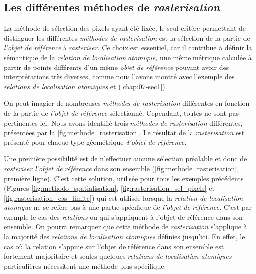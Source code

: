 \subsection{Les différentes méthodes de \emph{rasterisation}}

La méthode de sélection des pixels ayant été fixée, le seul critère
permettant de distinguer les différentes \emph{méthodes de
  rasterisation} est la sélection de la partie de \emph{l'objet de
  référence} à \emph{rasteriser.} Ce choix est essentiel, car il
contribue à définir la sémantique de la \emph{relation de localisation
  atomique,} une même métrique calculée à partir de points différents
d'un même \emph{objet de référence} pouvant avoir des interprétations
très diverses, comme nous l'avons montré avec l'exemple des
\emph{relations de localisation atomiques}
 et 
(\autoref{chap:07-sec1}).

On peut imagier de nombreuses \emph{méthodes de rasterisation}
différentes en fonction de la partie de \emph{l'objet de référence}
sélectionné. Cependant, toutes ne sont pas pertinentes ici. Nous avons
identifié trois \emph{méthodes de rasterisation} différentes,
présentées par la \autoref{fig:methode_rasterisation}. Le résultat de
la \emph{rasterisation} est présenté pour chaque type géométrique
\emph{d'objet de référence.}

Une première possibilité est de n'effectuer aucune sélection préalable
et donc de \emph{rasteriser} \emph{l'objet de référence} dans son
ensemble (\autoref{fig:methode_rasterisation}, première ligne). C'est
cette solution, utilisée pour tous les exemples précédents (Figures
\ref{fig:methodo_spatialisation}, \ref{fig:rasterisation_sel_pixels}
et \ref{fig:rasterisation_cas_limite}) qui est utilisée lorsque la
\emph{relation de localisation atomique} ne se réfère pas à une partie
spécifique de \emph{l'objet de référence.} C'est par exemple le cas
des \emph{relations}  ou 
qui s'appliquent à l'objet de référence dans son ensemble. On pourra
remarquer que cette méthode de \emph{rasterisation} s'applique à la
majorité des \emph{relations de localisation atomiques} définies
jusqu'ici. En effet, le cas où la relation s'appuie sur l'objet de
référence dans son ensemble est fortement majoritaire et seules
quelques \emph{relations de localisation atomiques} particulières
nécessitent une méthode plus spécifique.

